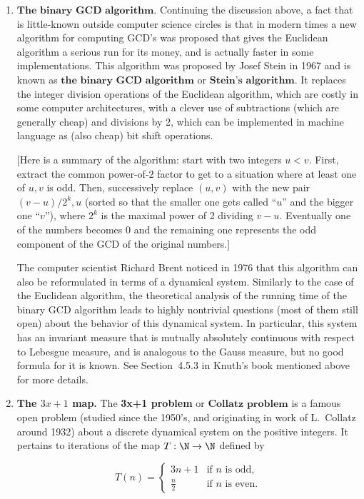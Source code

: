 \begin{enumerate}[label=\arabic*.]
\item $\textbf{The binary GCD algorithm.}$ Continuing the
discussion above, a fact that is little-known outside
computer science circles is that in modern times a new
algorithm for computing GCD's was proposed that gives
the Euclidean algorithm a serious run for its money,
and is actually faster in some implementations. This
algorithm was proposed by Josef Stein in 1967 and is
known as $\textbf{the binary GCD algorithm}$ or
$\textbf{Stein's algorithm}$. It replaces the integer
division operations of the Euclidean algorithm, which
are costly in some computer architectures, with a
clever use of subtractions (which are generally cheap)
and divisions by 2, which can be implemented in
machine language as (also cheap) bit shift operations.

[Here is a summary of the algorithm: start with two
integers $u<v$. First, extract the common power-of-$2$
factor to get to a situation where at least one of
$u,v$ is odd. Then, successively replace $(u,v)$ with
the new pair $(v-u)/2^k,u$ (sorted so that the
smaller one gets called ``$u$'' and the bigger one
``$v$''), where $2^k$ is the maximal power of 2
dividing $v-u$. Eventually one of the numbers becomes
$0$ and the remaining one represents the odd
component of the GCD of the original numbers.]

The computer scientist Richard Brent noticed in 1976
that this algorithm can also be reformulated in terms
of a dynamical system. Similarly to the case of the
Euclidean algorithm, the theoretical analysis of the
running time of the binary GCD algorithm leads to
highly nontrivial questions (most of them still open)
about the behavior of this dynamical system. In
particular, this system has an invariant measure that
is mutually absolutely continuous with respect to
Lebesgue measure, and is analogous to the Gauss
measure, but no good formula for it is known. See
Section~4.5.3 in Knuth's book mentioned above for more
details.

\item \textbf{The $3x+1$ map.} The \textbf{3x+1 problem} or
$\textbf{Collatz problem}$ is a famous open problem
(studied since the 1950's, and originating in work of
L.~Collatz around 1932) about a discrete dynamical
system on the positive integers. It pertains to
iterations of the map $T:\N\to\N$ defined by

\[
T(n) = \begin{cases} 3n+1 & \textrm{if $n$ is odd}, \\ \frac{\displaystyle n}{\displaystyle 2} & \textrm{if $n$ is even}.
\end{cases}
\]


\end{enumerate}
